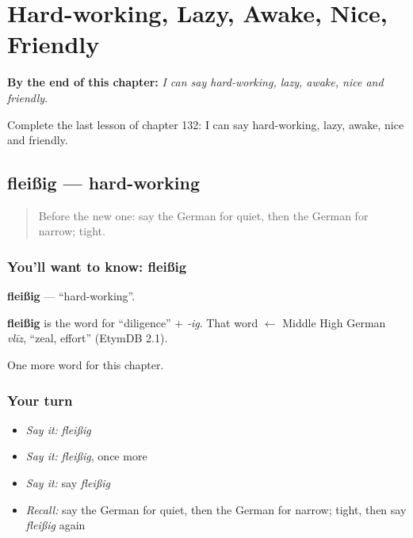
\chapter{Hard-working, Lazy, Awake, Nice, Friendly}
\label{ch:ge-hard-working-lazy-awake-nice-friendly}

\begin{chapteropening}
\textbf{By the end of this chapter:} \emph{I can say hard-working, lazy, awake, nice and friendly.}

Complete the last lesson of chapter 132: I can say hard-working, lazy, awake, nice and friendly.
\end{chapteropening}

\section[fleißig]{fleißig — hard-working}

\label{lesson:GE-C132-fleissig}



\begin{quote}
Before the new one: say the German for quiet, then the German for narrow; tight.
\end{quote}

\subsection*{You'll want to know: fleißig}
\textbf{fleißig} — \textquotedblleft{}hard-working\textquotedblright{}.

\begin{cousinweb}
\textbf{fleißig} is the word for \textquotedblleft{}diligence\textquotedblright{} + \emph{-ig}. That word $\leftarrow$ Middle High German \emph{vlīz}, \textquotedblleft{}zeal, effort\textquotedblright{} (EtymDB 2.1).
\end{cousinweb}

\begin{grammarlens}[title={What you've built}]
One more word for this chapter.
\end{grammarlens}

\subsection*{Your turn}
\begin{itemize}
\raggedright
  \item \emph{Say it:} \emph{fleißig}
  \item \emph{Say it:} \emph{fleißig}, once more
  \item \emph{Say it:} say \emph{fleißig}
  \item \emph{Recall:} say the German for quiet, then the German for narrow; tight, then say \emph{fleißig} again
\end{itemize}

